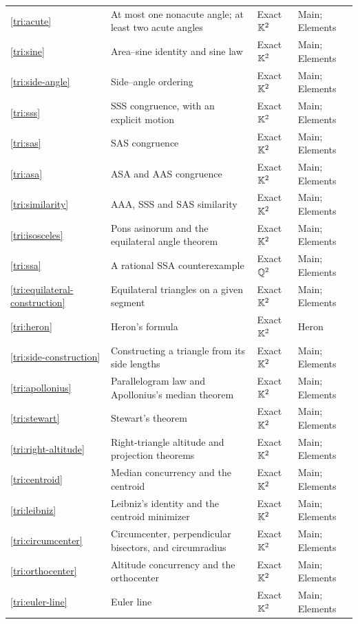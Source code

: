 {\begin{longtable}{@{}>{\raggedright\arraybackslash}p{}>{\raggedright\arraybackslash}p{}>{\raggedright\arraybackslash}p{}>{\raggedright\arraybackslash}p{}@{}}
\ref{tri:acute} & At most one nonacute angle; at least two acute angles & Exact $\mathbb K^2$ & Main; Elements\\
\ref{tri:sine} & Area--sine identity and sine law & Exact $\mathbb K^2$ & Main; Elements\\
\ref{tri:side-angle} & Side--angle ordering & Exact $\mathbb K^2$ & Main; Elements\\
\ref{tri:sss} & SSS congruence, with an explicit motion & Exact $\mathbb K^2$ & Main; Elements\\
\ref{tri:sas} & SAS congruence & Exact $\mathbb K^2$ & Main; Elements\\
\ref{tri:asa} & ASA and AAS congruence & Exact $\mathbb K^2$ & Main; Elements\\
\ref{tri:similarity} & AAA, SSS and SAS similarity & Exact $\mathbb K^2$ & Main; Elements\\
\ref{tri:isosceles} & Pons asinorum and the equilateral angle theorem & Exact $\mathbb K^2$ & Main; Elements\\
\ref{tri:ssa} & A rational SSA counterexample & Exact $\mathbb Q^2$ & Main; Elements\\
\ref{tri:equilateral-construction} & Equilateral triangles on a given segment & Exact $\mathbb K^2$ & Main; Elements\\
\ref{tri:heron} & Heron's formula & Exact $\mathbb K^2$ & Heron\\
\ref{tri:side-construction} & Constructing a triangle from its side lengths & Exact $\mathbb K^2$ & Main; Elements\\
\ref{tri:apollonius} & Parallelogram law and Apollonius's median theorem & Exact $\mathbb K^2$ & Main; Elements\\
\ref{tri:stewart} & Stewart's theorem & Exact $\mathbb K^2$ & Main; Elements\\
\ref{tri:right-altitude} & Right-triangle altitude and projection theorems & Exact $\mathbb K^2$ & Main; Elements\\
\ref{tri:centroid} & Median concurrency and the centroid & Exact $\mathbb K^2$ & Main; Elements\\
\ref{tri:leibniz} & Leibniz's identity and the centroid minimizer & Exact $\mathbb K^2$ & Main; Elements\\
\ref{tri:circumcenter} & Circumcenter, perpendicular bisectors, and circumradius & Exact $\mathbb K^2$ & Main; Elements\\
\ref{tri:orthocenter} & Altitude concurrency and the orthocenter & Exact $\mathbb K^2$ & Main; Elements\\
\ref{tri:euler-line} & Euler line & Exact $\mathbb K^2$ & Main; Elements\\

\end{longtable}}

